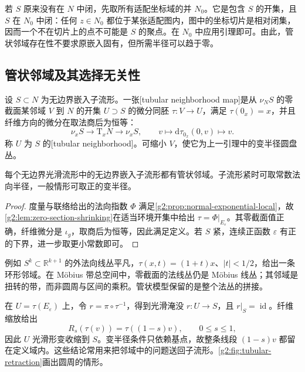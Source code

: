 若 \(S\) 原来没有在 \(N\) 中闭，先取所有适配坐标域的并 \(N_0\)。它是包含 \(S\) 的开集，且 \(S\) 在 \(N_0\) 中闭：任何 \(z\in N_0\) 都位于某张适配图内，图中的坐标切片是相对闭集，因而一个不在切片上的点不可能是 \(S\) 的聚点。在 \(N_0\) 中应用引理即可。由此，管状邻域存在性不要求原嵌入固有，但所需半径可以趋于零。

\subsection{管状邻域及其选择无关性}
\label{g2:subsec:1503:04}

\begin{definition}\label{g2:def:tubular-neighborhood}
	设 \(S\subset N\) 为无边界嵌入子流形。一张[tubular neighborhood map]是从 \(\nu_NS\) 的零截面某邻域 \(V\) 到 \(N\) 的开集 \(U\supset S\) 的微分同胚 \(\tau:V\to U\)，满足 \(\tau(0_x)=x\)，并且纤维方向的微分在取法商后为恒等：
	\[
		\nu_xS\longrightarrow\mathrm{T}_xN\longrightarrow\nu_xS,
		\qquad v\longmapsto\mathrm{d}\tau_{0_x}(0,v)\longmapsto v.
	\]
	称 \(U\) 为 \(S\) 的[tubular neighborhood]。可缩小 \(V\)，使它为上一引理中的变半径圆盘丛。
\end{definition}

\begin{theorem}[管状邻域定理]\label{g2:thm:tubular-neighborhood}
	每个无边界光滑流形中的无边界嵌入子流形都有管状邻域。子流形紧时可取常数法向半径，一般情形可取正的变半径。
\end{theorem}
\begin{proof}
	度量与联络给出的法向指数 \(\Phi\) 满足\cref{g2:prop:normal-exponential-local}，故\cref{g2:lem:zero-section-shrinking}在适当环境开集中给出 \(\tau=\Phi|_{E_\varepsilon}\)。其零截面值正确，纤维微分是 \(\iota_g\)，取商后为恒等，因此满足定义。若 \(S\) 紧，连续正函数 \(\varepsilon\) 有正的下界，进一步取更小常数即可。
\end{proof}

例如 \(S^k\subset\mathbb R^{k+1}\) 的外法向线丛平凡，\(\tau(x,t)=(1+t)x\)、\(|t|<1/2\)，给出一条环形邻域。在 Möbius 带总空间中，零截面的法线丛仍是 Möbius 线丛；其邻域是扭转的带，而非圆周与区间的乘积。管状模型保留的是整个法丛的拼接。

\ProseParagraphBreak

在 \(U=\tau(E_\varepsilon)\) 上，令 \(r=\pi\circ\tau^{-1}\)，得到光滑淹没 \(r:U\to S\)，且 \(r|_S=\operatorname{id}\)。纤维缩放给出
\[
	R_s(\tau(v))=\tau((1-s)v),\qquad0\le s\le1,
\]
因此 \(U\) 光滑形变收缩到 \(S\)。变半径条件只依赖基点，故整条线段 \((1-s)v\) 都留在定义域内。这些结论常用来把邻域中的问题送回子流形。\cref{g2:fig:tubular-retraction}画出圆周的情形。

